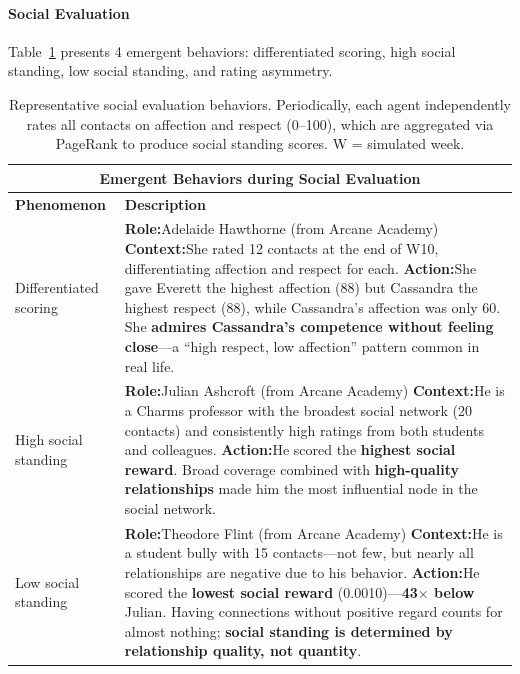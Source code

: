 \paragraph{Social Evaluation}
Table~\ref{tab:social-eval} presents 4 emergent behaviors:
differentiated scoring, high social standing, low social standing, and rating asymmetry.

\begin{table}[t]
\centering
\small
\caption{Representative social evaluation behaviors. Periodically, each agent independently rates all contacts on affection and respect (0--100), which are aggregated via PageRank to produce social standing scores. W = simulated week.}
\label{tab:social-eval}
\begin{tabular}{p{0.8in}p{4.3in}}
\toprule
\multicolumn{2}{c}{\textbf{Emergent Behaviors during Social Evaluation}} \\
\midrule
\textbf{Phenomenon} & \textbf{Description} \\
\midrule

Differentiated \newline scoring
&
\textbf{Role:}\quad Adelaide Hawthorne \hfill (from Arcane Academy) \newline
\textbf{Context:}\quad She rated 12 contacts at the end of W10, differentiating affection and respect for each. \newline
\textbf{Action:}\quad She gave Everett the highest affection (88) but Cassandra the highest respect (88), while Cassandra's affection was only 60. She \textbf{admires Cassandra's competence without feeling close}---a ``high respect, low affection'' pattern common in real life.
\\
\midrule

High social \newline standing
&
\textbf{Role:}\quad Julian Ashcroft \hfill (from Arcane Academy) \newline
\textbf{Context:}\quad He is a Charms professor with the broadest social network (20 contacts) and consistently high ratings from both students and colleagues. \newline
\textbf{Action:}\quad He scored the \textbf{highest social reward}. Broad coverage combined with \textbf{high-quality relationships} made him the most influential node in the social network.
\\
\midrule

Low social \newline standing
&
\textbf{Role:}\quad Theodore Flint \hfill (from Arcane Academy) \newline
\textbf{Context:}\quad He is a student bully with 15 contacts---not few, but nearly all relationships are negative due to his behavior. \newline
\textbf{Action:}\quad He scored the \textbf{lowest social reward} (0.0010)---\textbf{43$\times$ below} Julian. Having connections without positive regard counts for almost nothing; \textbf{social standing is determined by relationship quality, not quantity}.
\\
\midrule


\end{tabular}
\end{table}
